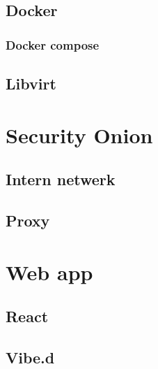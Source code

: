 \documentclass[a4paper, 12pt]{report}
\begin{document}
\subsection{Docker}
\subsubsection{Docker compose}
\subsection{Libvirt}

\section{Security Onion}
\subsection{Intern netwerk}
\subsection{Proxy}

\section{Web app}
\subsection{React}
\subsection{Vibe.d}
\end{document}
